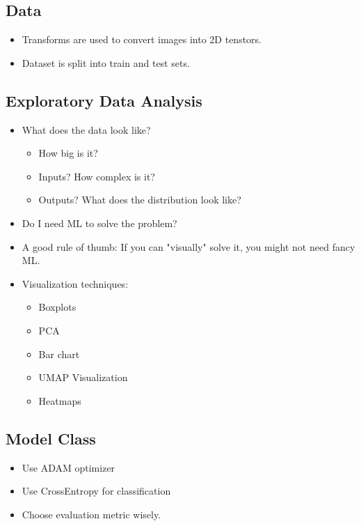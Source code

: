 \subsection{Data}
\begin{notes}
    \begin{itemize}
        \item Transforms are used to convert images into 2D tenstors. 
        \item Dataset is split into train and test sets.
    \end{itemize}
\end{notes}

\subsection{Exploratory Data Analysis}
\begin{notes}
    \begin{itemize}
        \item What does the data look like? 
        \begin{itemize}
            \item How big is it?
            \item Inputs? How complex is it?
            \item Outputs? What does the distribution look like?
        \end{itemize}
        \item Do I need ML to solve the problem?
        \item A good rule of thumb: If you can "visually" solve it, you might not need fancy ML. 
        \item Visualization techniques: 
        \begin{itemize}
            \item Boxplots
            \item PCA 
            \item Bar chart
            \item UMAP Visualization
            \item Heatmaps
        \end{itemize}
    \end{itemize}
\end{notes}

\subsection{Model Class}
\begin{notes}
    \begin{itemize}
        \item Use ADAM optimizer
        \item Use CrossEntropy for classification
        \item Choose evaluation metric wisely. 
    \end{itemize}
\end{notes}